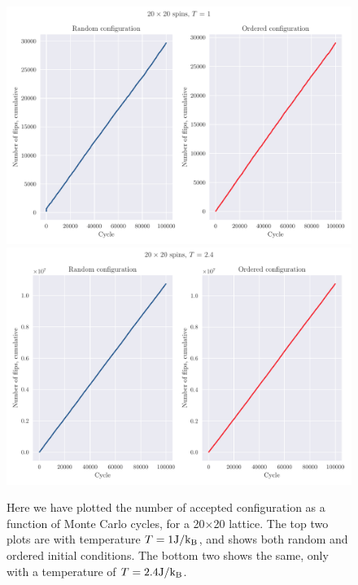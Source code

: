 \documentclass[reprint, english,notitlepage,nofootinbib]{revtex4-1}  %
\begin{document}
\begin{figure}[!htb]
	\includegraphics[width=16cm]{../output/de/L20-T1-dT0_0-NT1-N5-NumFlips.pdf}
	\includegraphics[width=16cm]{../output/de/L20-T2_4-dT0_0-NT1-N5-NumFlips.pdf}
	\caption{Here we have plotted the number of accepted configuration as a function of Monte Carlo cycles, for a 20$\times$20 lattice. The top two plots are with temperature $T=1\rm{J}/k_B$, and shows both random and ordered initial conditions. The bottom two shows the same, only with a temperature of $T = 2.4\rm{J}/k_B$.}
	\label{fig:Num_flips_T1_and_T2_4}
\end{figure}
\end{document}
